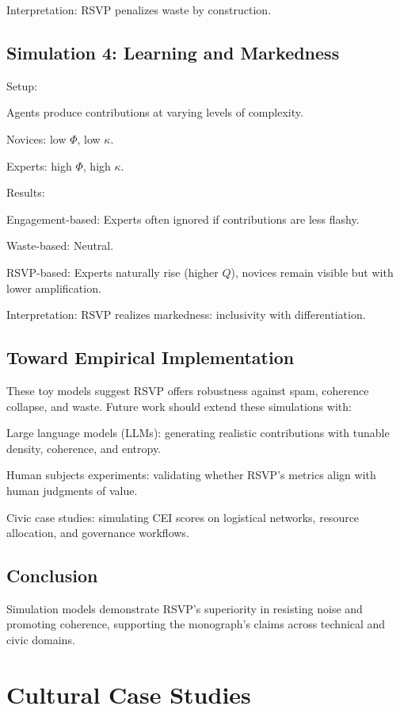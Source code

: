 \documentclass[openany]{book}
\begin{document}
Interpretation: RSVP penalizes waste by construction.

\section{Simulation 4: Learning and Markedness}

Setup:

Agents produce contributions at varying levels of complexity.

Novices: low \( \Phi \), low \( \kappa \).

Experts: high \( \Phi \), high \( \kappa \).

Results:

Engagement-based: Experts often ignored if contributions are less flashy.

Waste-based: Neutral.

RSVP-based: Experts naturally rise (higher \( Q \)), novices remain visible but with lower amplification.

Interpretation: RSVP realizes markedness: inclusivity with differentiation.

\section{Toward Empirical Implementation}

These toy models suggest RSVP offers robustness against spam, coherence collapse, and waste. Future work should extend these simulations with:

Large language models (LLMs): generating realistic contributions with tunable density, coherence, and entropy.

Human subjects experiments: validating whether RSVP’s metrics align with human judgments of value.

Civic case studies: simulating CEI scores on logistical networks, resource allocation, and governance workflows.

\section{Conclusion}

Simulation models demonstrate RSVP’s superiority in resisting noise and promoting coherence, supporting the monograph’s claims across technical and civic domains.

\chapter{Cultural Case Studies}
\end{document}

